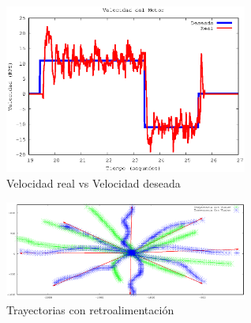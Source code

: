 \documentclass[twocolumn,10pt]{amrob}
\begin{document}
\begin{figure}
  \centering
    \includegraphics[width=8cm]{VelocidadM4.eps}
  \caption{Velocidad real vs Velocidad deseada}
  \label{fig:realVSdes}
\end{figure}
\begin{figure}
  \centering
    \includegraphics[width=8cm]{output1.eps}
  \caption{Trayectorias con retroalimentación}
  \label{fig:visionPruebasRetro}
\end{figure}




\end{document}
